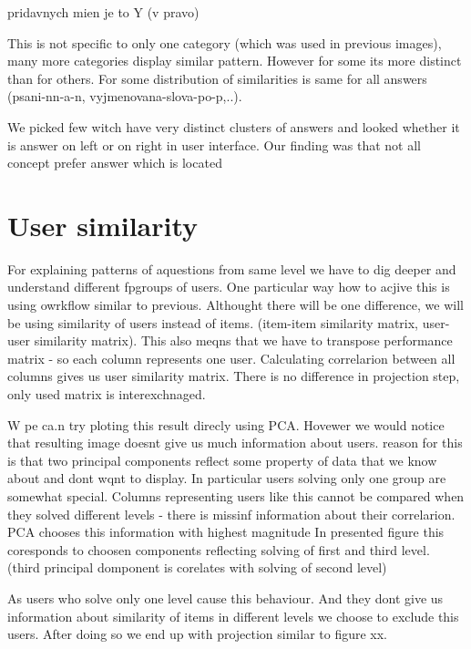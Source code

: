 \documentclass[
  digital, %
  table,   %
  nolof,     %
  nolot,     %
  nocover
]{fithesis3}
\begin{document}
pridavnych mien je to Y (v pravo)

This is not specific to only one category (which was used in previous
images), many more categories display similar pattern. However for some
its more distinct than for others. For some distribution of similarities
is same for all answers (psani-nn-a-n, vyjmenovana-slova-po-p,..).

We picked few witch have very distinct clusters of answers and looked whether it is
answer on left or on right in user interface. Our finding was that not all concept prefer answer which is  located


\section{User similarity}\label{user-similarity}


For explaining patterns of aquestions from same level we have to dig
deeper and understand different fpgroups of users. One particular way
how to acjive this is using owrkflow similar to previous. Althought
there will be one difference, we will be using similarity of users
instead of items. (item-item similarity matrix, user-user similarity
matrix). This also meqns that we have to transpose performance matrix -
so each column represents one user. Calculating correlarion between all
columns gives us user similarity matrix. There is no difference in
projection step, only used matrix is interexchnaged.

W pe ca.n try ploting this result direcly using PCA. Hovewer we would
notice that resulting image doesnt give us much information about users.
reason for this is that two principal components reflect some property
of data that we know about and dont wqnt to display. In particular users
solving only one group are somewhat special. Columns representing users
like this cannot be compared when they solved different levels - there
is missinf information about their correlarion. PCA chooses this
information with highest magnitude In presented figure this coresponds
to choosen components reflecting solving of first and third level.
(third principal domponent is corelates with solving of second level)

As users who solve only one level cause this behaviour. And they dont
give us information about similarity of items in different levels we
choose to exclude this users. After doing so we end up with projection
similar to figure xx.
\end{document}

